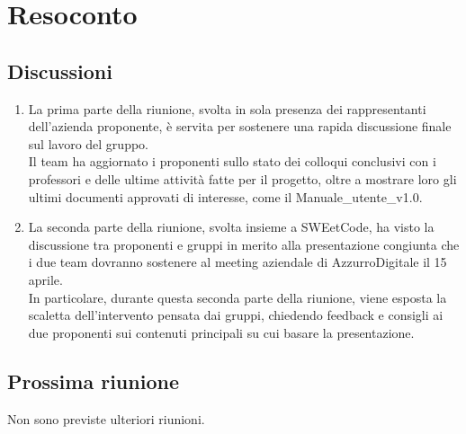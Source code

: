 \section{Resoconto} \label{sec:resoconto}
\subsection{Discussioni} \label{subsec:resdiscussione}
\begin{enumerate}
    \item La prima parte della riunione, svolta in sola presenza dei rappresentanti dell'azienda proponente, è servita per sostenere una rapida discussione finale sul lavoro del gruppo.\\
    Il team ha aggiornato i proponenti sullo stato dei colloqui conclusivi con i professori e delle ultime attività fatte per il progetto, oltre a mostrare loro gli ultimi documenti approvati di interesse, come il Manuale\_utente\_v1.0.
    \item La seconda parte della riunione, svolta insieme a SWEetCode, ha visto la discussione tra proponenti e gruppi in merito alla presentazione congiunta che i due team dovranno sostenere al meeting aziendale di AzzurroDigitale il 15 aprile.\\
    In particolare, durante questa seconda parte della riunione, viene esposta la scaletta dell'intervento pensata dai gruppi, chiedendo feedback e consigli ai due proponenti sui contenuti principali su cui basare la presentazione.
\end{enumerate}
\subsection{Prossima riunione} \label{subsec:riunione}
Non sono previste ulteriori riunioni.

